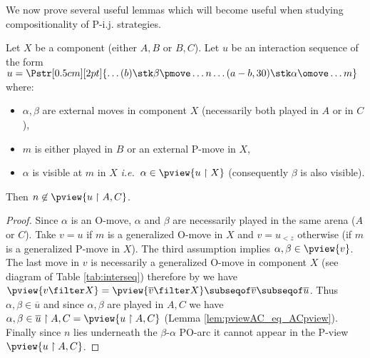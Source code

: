 We now prove several useful lemmas which will become useful when studying compositionality of P-i.j. strategies.

\begin{lemma}
\label{lem:interjump}
Let $X$ be a component (either  $A,B$ or  $B,C$).
Let $u$ be an interaction sequence of the form
$ u =
\Pstr[0.5cm][2pt]{ \ldots (b){\stk \beta \pmove}  \ldots
 {n}  \ldots  (a-b,30){\stk \alpha\omove}
\ldots m}$ where:
\begin{itemize}[-]
\item $\alpha,\beta$ are external moves in component $X$ (necessarily both played in $A$ or in $C$),
\item  $m$ is either played in $B$ or an external P-move in $X$,
\item  $\alpha$ is visible at $m$ in $X$ \emph{i.e.}~$\alpha\in \pview{u \upharpoonright X}$ (consequently $\beta$ is also visible).
\end{itemize}
Then $n \not\in \pview{u \upharpoonright A, C}$.
\end{lemma}
\begin{proof}
Since $\alpha$ is an O-move, $\alpha$ and $\beta$ are necessarily played in the same arena ($A$ or $C$).
Take $v=u$ if $m$ is a generalized O-move in $X$
and $v=u_{<z}$ otherwise (if $m$ is a generalized P-move in $X$).
The third assumption implies
$\alpha,\beta\in \pview{v}$.
The last move in $v$ is necessarily a generalized O-move in component $X$ (see diagram of Table \ref{tab:interseq})
therefore by \cite[Lemma 3.3.1]{Harmer2005}
we have $\pview{v \filter X} = \pview{\overline{v} \filter X} \subseqof \overline{v} \subseqof \overline{u}$.
Thus $\alpha,\beta \in \overline{u}$ and
since $\alpha,\beta$ are played in $A,C$ we have
$\alpha,\beta  \in \overline{u} \upharpoonright A,C
= \pview{u \upharpoonright A,C}$ (Lemma \ref{lem:pviewAC_eq_ACpview}).
Finally since $n$ lies underneath the $\beta$-$\alpha$ PO-arc
it cannot appear in the P-view  $\pview{u \upharpoonright A,C}$.
\end{proof}

